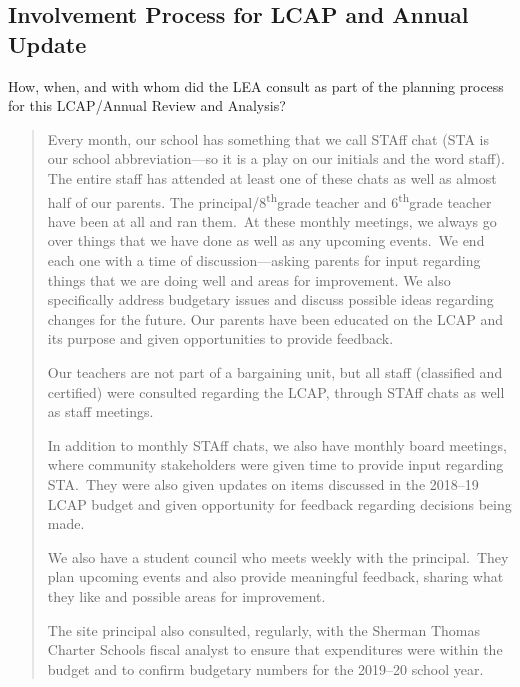 \documentclass{article}
\renewcommand{\th}{\textsuperscript{th}}
\begin{document}
\subsection{Involvement Process for LCAP and Annual Update}
How, when, and with whom did the LEA consult as part of the planning process for this LCAP/Annual Review and Analysis?
\begin{quotation}
	Every month, our school has something that we call STAff chat (STA is our school abbreviation---so it is a play on our initials and the word staff).  The entire staff has attended at least one of these chats as well as almost half of our parents. The principal/8\th grade teacher and 6\th grade teacher have been at all and ran them. At these monthly meetings, we always go over things that we have done as well as any upcoming events. We end each one with a time of discussion---asking parents for input regarding things that we are doing well and areas for improvement. We also specifically address budgetary issues and discuss possible ideas regarding changes for the future. Our parents have been educated on the LCAP and its purpose and given opportunities to provide feedback.

	Our teachers are not part of a bargaining unit, but all staff (classified and certified) were consulted regarding the LCAP, through STAff chats as well as staff meetings.

	In addition to monthly STAff chats, we also have monthly board meetings, where community stakeholders were given time to provide input regarding STA. They were also given updates on items discussed in the 2018--19 LCAP budget and given opportunity for feedback regarding decisions being made.

	We also have a student council who meets weekly with the principal. They plan upcoming events and also provide meaningful feedback, sharing what they like and possible areas for improvement.

	The site principal also consulted, regularly, with the Sherman Thomas Charter Schools fiscal analyst to ensure that expenditures were within the budget and to confirm budgetary numbers for the 2019--20 school year.
\end{quotation}
\end{document}
